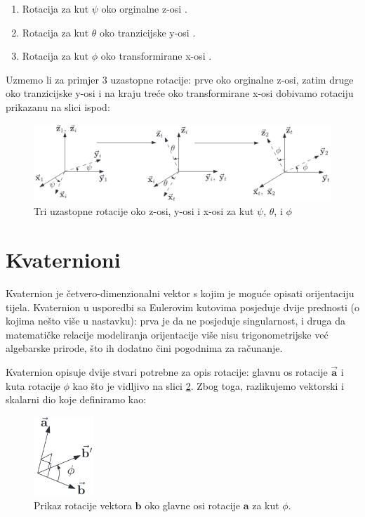 \documentclass[times, utf8, diplomski, numeric]{templates/template}
\begin{document}
{{        \begin{enumerate}
            \item Rotacija za kut $\psi$ oko orginalne z-osi .
            \item Rotacija za kut $\theta$ oko tranzicijske y-osi .
            \item Rotacija za kut $\phi$ oko transformirane x-osi .
        \end{enumerate}

        Uzmemo li za primjer 3 uzastopne rotacije: prve oko orginalne z-osi, zatim druge oko tranzicijske y-osi i na kraju treće oko transformirane x-osi dobivamo rotaciju prikazanu na slici ispod: 

        \begin{figure}[htb]
        \centering
        \includegraphics[width=1.0\textwidth]{images/eulerovi_kutovi.jpg}
        \caption{Tri uzastopne rotacije oko z-osi, y-osi i x-osi za kut $\psi$, $\theta$, i $\phi$}
        \label{fig:euler_rotacija}
        \end{figure}
    }

    \section{Kvaternioni}{
        Kvaternion je četvero-dimenzionalni vektor s kojim je moguće opisati orijentaciju tijela. Kvaternion u usporedbi sa Eulerovim kutovima posjeduje dvije prednosti (o kojima nešto više u nastavku): prva je da ne posjeduje singularnost, i druga da matematičke relacije modeliranja orijentacije više nisu trigonometrijske već algebarske prirode, što ih dodatno čini pogodnima za računanje.

        Kvaternion opisuje dvije stvari potrebne za opis rotacije: glavnu os rotacije  $\overrightarrow{\textbf{a}}$ i kuta rotacije $\phi$ kao što je vidljivo na slici \ref{fig:principal_axis_rotation}. Zbog toga, razlikujemo vektorski i skalarni dio koje definiramo kao:

        \begin{figure}[htb]
        \centering
        \includegraphics[width=0.2\textwidth]{images/principal_axis_rotation.png}
        \caption{Prikaz rotacije vektora $\textbf{b}$ oko glavne osi rotacije $\textbf{a}$ za kut $\phi$.}
        \label{fig:principal_axis_rotation}
        \end{figure}

}}
\end{document}
